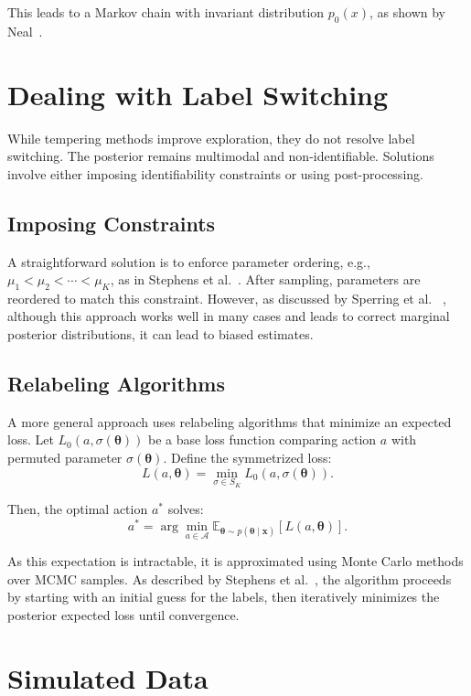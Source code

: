 \documentclass[11pt]{article}
\newcommand{\bx}{\boldsymbol{x}}
\newcommand{\btheta}{\boldsymbol{\theta}}
\begin{document}
This leads to a Markov chain with invariant distribution $p_0(x)$, as shown by Neal~\citep{neal1996sampling}.

\section{Dealing with Label Switching}

While tempering methods improve exploration, they do not resolve label switching. The posterior 
remains multimodal and non-identifiable. Solutions involve either imposing identifiability 
constraints or using post-processing.

\subsection{Imposing Constraints}

A straightforward solution is to enforce parameter ordering, e.g., 
$\mu_1 < \mu_2 < \cdots < \mu_K$, as in Stephens et al.~\citep{stephens1997bayesian}. After 
sampling, parameters are reordered to match this constraint. However, as discussed by Sperring et al.~
\citep{sperrin2010probabilistic}, although this approach works well in many cases and leads to correct
marginal posterior distributions, it can lead to biased estimates.

\subsection{Relabeling Algorithms}

A more general approach uses relabeling algorithms that minimize an expected loss. Let 
$L_0(a, \sigma(\btheta))$ be a base loss function comparing action $a$ with permuted parameter 
$\sigma(\btheta)$. Define the symmetrized loss:
\[
    L(a, \btheta) = \min_{\sigma \in S_K} L_0(a, \sigma(\btheta)).
\]

Then, the optimal action $a^*$ solves:
\[
    a^* = \arg\min_{a \in \mathcal{A}} \mathbb{E}_{\btheta \sim p(\btheta \mid \bx)}[L(a, \btheta)].
\]

As this expectation is intractable, it is approximated using Monte Carlo methods over MCMC samples. As 
described by Stephens et al.~\citep{stephens2002dealing}, the algorithm proceeds by starting with an
initial guess for the labels, then iteratively minimizes the posterior expected loss until convergence.

\section{Simulated Data}
\end{document}
